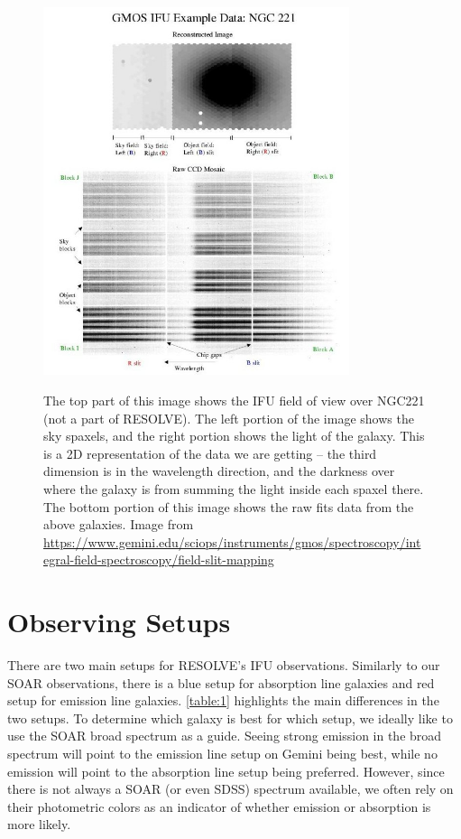 \documentclass[12pt]{report}
\begin{document}
\begin{figure}[h]
\centering
\includegraphics[width=0.8\textwidth]{fiber_examples.jpeg}
\label{figure:1}
\caption[IFU Fibers and Data Format]{The top part of this image shows the IFU field of view over NGC221 (not a part of RESOLVE). The left portion of the image shows the sky spaxels, and the right portion shows the light of the galaxy. This is a 2D representation of the data we are getting -- the third dimension is in the wavelength direction, and the darkness over where the galaxy is from summing the light inside each spaxel there. The bottom portion of this image shows the raw fits data from the above galaxies.  \footnotesize{Image from \url{https://www.gemini.edu/sciops/instruments/gmos/spectroscopy/integral-field-spectroscopy/field-slit-mapping}}}
\end{figure}

\section{Observing Setups}
There are two main setups for RESOLVE's IFU observations. Similarly to our SOAR observations, there is a blue setup for absorption line galaxies and red setup for emission line galaxies. \autoref{table:1} highlights the main differences in the two setups. To determine which galaxy is best for which setup, we ideally like to use the SOAR broad spectrum as a guide. Seeing strong emission in the broad spectrum will point to the emission line setup on Gemini being best, while no emission will point to the absorption line setup being preferred. However, since there is not always a SOAR (or even SDSS) spectrum available, we often rely on their photometric colors as an indicator of whether emission or absorption is more likely.
\end{document}
